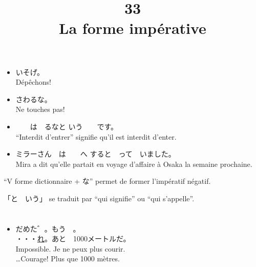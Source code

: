 \documentclass{article}
\date{}
\begin{document}
\begin{CJK*}{UTF8}{min}

  \title{ 33 \\
    La forme imp\'erative}
  \maketitle

  \section{}

  \begin{itemize}
  \item いそげ。\\
    D\'ep\^echons!
  \item さわるな。\\
    Ne touches pas!
  \item　　は　るなと
    いう　　です。\\
    ``Interdit d'entrer'' signifie qu'il est interdit d'enter.

  \item ミラーさん　は　　へ
    すると　って　いました。\\
    Mira a dit qu'elle partait en voyage d'affaire \`a
    Osaka la semaine prochaine.
  \end{itemize}

  ``V forme dictionnaire + な'' permet de former l'imp\'eratif n\'egatif.

  「と　いう」 se traduit par ``qui signifie'' ou ``qui s'appelle''.


  \section{}

  \begin{itemize}
  \item だめた゛。もう　。\\
    ・・・\underline{れ}。あと　1000メートルだ。\\
    Impossible. Je ne peux plus courir.\\
    \ldots Courage! Plus que 1000 m\`etres.


\end{itemize}
\end{CJK*}
\end{document}
